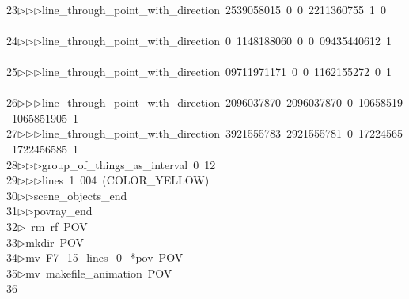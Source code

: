 \begin{tabbing}
\>\ \\[0pt]
23\>$\triangleright$\>$\triangleright$\>$\triangleright$\>line\_through\_point\_with\_direction\ 2539058015\ 0\ 0\ 2211360755\ 1\ 0\ \\[0pt]
\>\\[0pt]
24\>$\triangleright$\>$\triangleright$\>$\triangleright$\>line\_through\_point\_with\_direction\ 0\ 1148188060\ 0\ 0\ 09435440612\ 1\\[0pt]
\>\ \\[0pt]
25\>$\triangleright$\>$\triangleright$\>$\triangleright$\>line\_through\_point\_with\_direction\ 09711971171\ 0\ 0\ 1162155272\ 0\ 1\\[0pt]
\>\ \\[0pt]
26\>$\triangleright$\>$\triangleright$\>$\triangleright$\>line\_through\_point\_with\_direction\ 2096037870\ 2096037870\ 0\ 10658519\\[0pt]
\ 1065851905\ 1\ \\[0pt]
27\>$\triangleright$\>$\triangleright$\>$\triangleright$\>line\_through\_point\_with\_direction\ 3921555783\ 2921555781\ 0\ 17224565\\[0pt]
\ 1722456585\ 1\ \\[0pt]
28\>$\triangleright$\>$\triangleright$\>$\triangleright$\>group\_of\_things\_as\_interval\ 0\ 12\ \\[0pt]
29\>$\triangleright$\>$\triangleright$\>$\triangleright$\>lines\ 1\ 004\ (COLOR\_YELLOW)\ \\[0pt]
30\>$\triangleright$\>$\triangleright$\>scene\_objects\_end\ \\[0pt]
31\>$\triangleright$\>$\triangleright$\>povray\_end\\[0pt]
32\>$\triangleright$\>\ rm\ rf\ POV\\[0pt]
33\>$\triangleright$\>mkdir\ POV\\[0pt]
34\>$\triangleright$\>mv\ F7\_15\_lines\_0\_*pov\ POV\\[0pt]
35\>$\triangleright$\>mv\ makefile\_animation\ POV\\[0pt]
36\>\end{tabbing}
